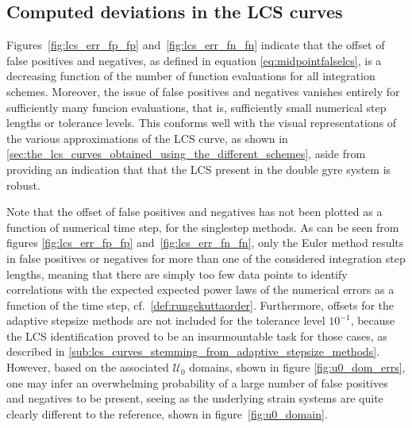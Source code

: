 \subsection{Computed deviations in the LCS curves}
\label{sub:computed_deviations_in_the_lcs_curves}

Figures~\ref{fig:lcs_err_fp_fp} and~\ref{fig:lcs_err_fn_fn} indicate that
the offset of false positives and negatives, as defined in equation
\eqref{eq:midpointfalselcs}, is a decreasing function of the number of
function evaluations for all integration schemes. Moreover, the issue of false
positives and negatives vanishes entirely for sufficiently many funcion
evaluations, that is, sufficiently small numerical step lengths or tolerance
levels. This conforms well with the visual representations of the various
approximations of the LCS curve, as shown in
\cref{sec:the_lcs_curves_obtained_using_the_different_schemes}, aside from
providing an indication that that the LCS present in the double gyre system is
robust.

Note that the offset of false positives and negatives has not been plotted as a function
of numerical time step, for the singlestep methods. As can be seen from figures
\ref{fig:lcs_err_fp_fp} and~\ref{fig:lcs_err_fn_fn}, only the Euler method
results in false positives or negatives for more than one of the considered
integration step lengths, meaning that there are simply too few data points
to identify correlations with the expected expected power laws of the numerical
errors as a function of the time step, cf.~\cref{def:rungekuttaorder}.
Furthermore, offsets for the adaptive stepsize methods are not included for the
tolerance level $10^{-1}$, because the LCS identification proved to be an
insurmountable task for those cases, as described in
\cref{sub:lcs_curves_stemming_from_adaptive_stepsize_methods}. However,
based on the associated $\mathcal{U}_{0}$ domains, shown in figure
\ref{fig:u0_dom_errs}, one may infer an overwhelming probability of a large
number of false positives and negatives to be present, seeing as the underlying
strain systems are quite clearly different to the reference, shown in
figure~\ref{fig:u0_domain}.




\clearpage


